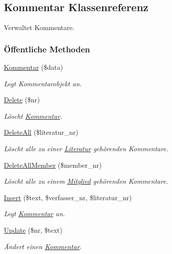 \hypertarget{classKommentar}{
\subsection{Kommentar Klassenreferenz}
\label{classKommentar}
}
Verwaltet Kommentare.  


\subsubsection*{\"{O}ffentliche Methoden}
\begin{CompactItemize}
\item 
\hyperlink{classKommentar_ea774e2108c754890c602dfdd53d64e1}{Kommentar} (\$data)
\begin{CompactList}\small\item\em Legt Kommentarobjekt an. \item\end{CompactList}\item 
\hyperlink{classKommentar_31c1fdfb4fb8f24e0016c8ddb98ddcdc}{Delete} (\$nr)
\begin{CompactList}\small\item\em Löscht \hyperlink{classKommentar}{Kommentar}. \item\end{CompactList}\item 
\hyperlink{classKommentar_9903f1df98f71eefa3b44a81d6a8ee5c}{Delete\-All} (\$literatur\_\-nr)
\begin{CompactList}\small\item\em Löscht alle zu einer \hyperlink{classLiteratur}{Literatur} gehörenden Kommentare. \item\end{CompactList}\item 
\hyperlink{classKommentar_92a8fcea1b065341c7c53e8a8464fcf0}{Delete\-All\-Member} (\$member\_\-nr)
\begin{CompactList}\small\item\em Löscht alle zu einem \hyperlink{classMitglied}{Mitglied} gehörenden Kommentare. \item\end{CompactList}\item 
\hyperlink{classKommentar_6119b3c12a61d8d5a41cded165517914}{Insert} (\$text, \$verfasser\_\-nr, \$literatur\_\-nr)
\begin{CompactList}\small\item\em Legt \hyperlink{classKommentar}{Kommentar} an. \item\end{CompactList}\item 
\hyperlink{classKommentar_0b3e20e910493e67b67b747243f04511}{Update} (\$nr, \$text)
\begin{CompactList}\small\item\em Ändert einen \hyperlink{classKommentar}{Kommentar}. \item\end{CompactList}\end{CompactItemize}

